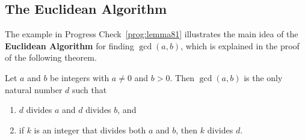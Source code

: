 \subsection*{The Euclidean Algorithm}
The example in Progress Check~\ref{prog:lemma81} illustrates the main idea of the 
\textbf{Euclidean Algorithm}
%
 for finding $\gcd( {a, b} )$, which is explained in the proof of the following theorem.


%
%
%
\setcounter{equation}{0}

\begin{theorem}\label{T:euclidalgo}
Let  $a$  and  $b$  be integers with $a \ne 0$  and  $b > 0$.  Then  
$\gcd( {a, b} )$ is the only natural number  $d$  such that
\renewcommand{\labelenumi}{(\textbf{\alph{enumi}})}
\renewcommand{\theenumi}{({\alph{enumi}})}
\begin{enumerate}
\item \label{T:euclidalgo1} $d$ divides  $a$ and  $d$ divides  $b$, and  %
\item \label{T:euclidalgo2}if  $k$  is an integer that divides both $a$  and  $b$, then  $k$  divides  $d$.  
\end{enumerate}
\end{theorem}
%

